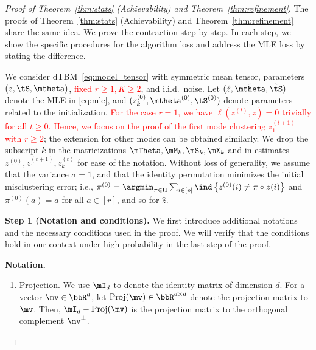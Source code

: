 \documentclass[lettersize,onecolumn,journal]{IEEEtran}
\theoremstyle{definition}
\theoremstyle{definition}
\newcommand{\offf}[1]{\left\{#1\right\}}
\begin{document}
\begin{proof}[Proof of Theorem~\ref{thm:stats} (Achievability) and Theorem~\ref{thm:refinement}]

{
\color{blue}

The proofs of Theorem~\ref{thm:stats} (Achievability) and Theorem~\ref{thm:refinement} share the same idea. We prove the contraction step by step. In each step, we show the specific procedures for the algorithm loss and address the MLE loss by stating the difference. 


We consider dTBM~\eqref{eq:model_tensor} with symmetric mean tensor, parameters $(z, \tS, \mtheta)$, \textcolor{red}{fixed $r\geq 1, K \geq 2$}, and i.i.d.\ noise.  Let $(\hat z, \hat \mtheta, \hat \tS)$ denote the MLE in \eqref{eq:mle}, and $(z^{(0)}_k, \mtheta^{(0)}, \tS^{(0)})$ denote parameters related to the initialization.  \textcolor{red}{For the case $r = 1$, we have $\ell(z^{(t)}, z) = 0$ trivially for all $t \geq 0$. Hence, we focus on the proof of the first mode clustering $z^{(t+1)}_1$ with $r \geq 2$}; the extension for other modes can be obtained similarly. We drop the subscript $k$ in the matricizations $\mTheta, \mM_k, \mS_k, \mX_k$ and in estimates $z^{(0)}, z^{(t+1)}_1, z^{(t)}_k$ for ease of the notation.  Without loss of generality, we assume that the variance $\sigma = 1$, and that the identity permutation minimizes the initial misclustering error; i.e., $\pi^{(0)} = \argmin_{\pi \in \Pi} \sum_{i \in [p]}\ind \offf{z^{(0)}(i) \neq \pi \circ z(i) }$ and $\pi^{(0)}(a) = a$ for all $ a \in [r]$, and so for $\hat z$. 
}



{\bf Step 1 (Notation and conditions).} We first introduce additional notations and the necessary conditions used in the proof. We will verify that the conditions hold in our context under high probability in the last step of the proof. 

{
\color{blue}

\textbf{Notation.}
\begin{enumerate}[wide]

\item Projection. We use $\mI_d$ to denote the identity matrix of dimension $d$. For a vector $\mv \in \bbR^d$, let $\text{Proj}(\mv) \in \bbR^{d \times d}$ denote the projection matrix to $\mv$. Then, $\mI_d - \text{Proj}(\mv)$ is the projection matrix to the orthogonal complement $\mv^{\perp}$. 


\end{enumerate}}
\end{proof}
\end{document}
